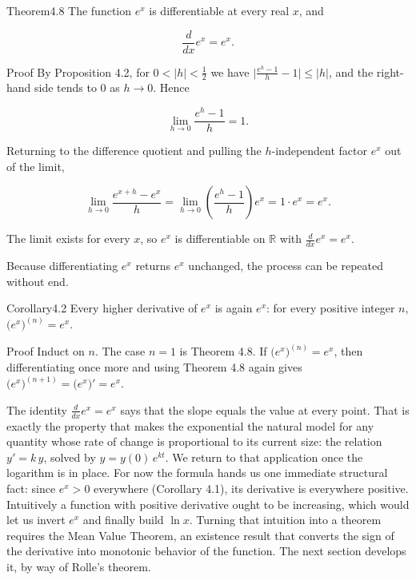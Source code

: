 \documentclass[a4paper,12pt,oneside]{memoir}
\begin{document}
\begin{envtheorem}{Theorem}{4.8}{}
The function \(e^{x}\) is differentiable at every real \(x\), and

\[ \frac{d}{dx} e^{x} = e^{x}. \]
\end{envtheorem}
\begin{envproof}{Proof}{}{}
By Proposition 4.2, for \(0 < \lvert h \rvert < \tfrac{1}{2}\) we have \(\bigl\lvert \tfrac{e^{h} - 1}{h} - 1 \bigr\rvert \le \lvert h \rvert\), and the right-hand side tends to \(0\) as \(h \to 0\). Hence

\[ \lim_{h \to 0} \frac{e^{h} - 1}{h} = 1. \]

Returning to the difference quotient and pulling the \(h\)-independent factor \(e^{x}\) out of the limit,

\[ \lim_{h \to 0} \frac{e^{x + h} - e^{x}}{h} = \lim_{h \to 0} \left( \frac{e^{h} - 1}{h} \right) e^{x} = 1 \cdot e^{x} = e^{x}. \]

The limit exists for every \(x\), so \(e^{x}\) is differentiable on \(\mathbb{R}\) with \(\frac{d}{dx} e^{x} = e^{x}\). \qedmark
\end{envproof}
Because differentiating \(e^{x}\) returns \(e^{x}\) unchanged, the process can be repeated without end.

\begin{envcorollary}{Corollary}{4.2}{}
Every higher derivative of \(e^{x}\) is again \(e^{x}\): for every positive integer \(n\), \(\bigl(e^{x}\bigr)^{(n)} = e^{x}\).
\end{envcorollary}
\begin{envproof}{Proof}{}{}
Induct on \(n\). The case \(n = 1\) is Theorem 4.8. If \(\bigl(e^{x}\bigr)^{(n)} = e^{x}\), then differentiating once more and using Theorem 4.8 again gives \(\bigl(e^{x}\bigr)^{(n + 1)} = \bigl(e^{x}\bigr)' = e^{x}\). \qedmark
\end{envproof}
The identity \(\frac{d}{dx} e^{x} = e^{x}\) says that the slope equals the value at every point. That is exactly the property that makes the exponential the natural model for any quantity whose rate of change is proportional to its current size: the relation \(y' = k\,y\), solved by \(y = y(0)\,e^{kt}\). We return to that application once the logarithm is in place. For now the formula hands us one immediate structural fact: since \(e^{x} > 0\) everywhere (Corollary 4.1), its derivative is everywhere positive. Intuitively a function with positive derivative ought to be increasing, which would let us invert \(e^{x}\) and finally build \(\ln x\). Turning that intuition into a theorem requires the Mean Value Theorem, an existence result that converts the sign of the derivative into monotonic behavior of the function. The next section develops it, by way of Rolle’s theorem.
\end{document}
